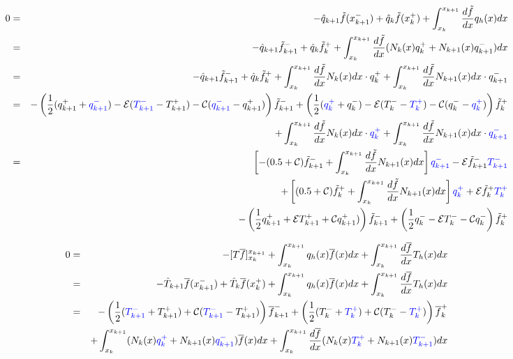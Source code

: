 \begin{eqnarray}
0 &=&
-\hat{q}_{k+1} \tilde{f}(x_{k+1}^-)
+\hat{q}_k     \tilde{f}(x_k^+)
+ \int_{x_k}^{x_{k+1}} \frac{d\tilde{f}}{dx} q_h(x) dx  \nonumber\\
&=&-\hat{q}_{k+1} \tilde{f}_{k+1}^-
+\hat{q}_k     \tilde{f}_k^+
+ \int_{x_k}^{x_{k+1}} \frac{d\tilde{f}}{dx} ( N_k(x) q_k^+ + N_{k+1}(x)q_{k+1}^- ) dx \nonumber\\
&=& -\hat{q}_{k+1} \tilde{f}_{k+1}^-
+\hat{q}_k     \tilde{f}_k^+
+ \int_{x_k}^{x_{k+1}} \frac{d\tilde{f}}{dx} N_k(x) dx \cdot q_k^+ 
+ \int_{x_k}^{x_{k+1}} \frac{d\tilde{f}}{dx} N_{k+1}(x) dx \cdot q_{k+1}^- \nonumber\\
&=&
-\left( \frac{1}{2}(q_{k+1}^+ + {\color{blue} q_{k+1}^-}) 
- {\cal E} ({\color{blue}T_{k+1}^-} - T_{k+1}^+) - {\cal C}({\color{blue} q_{k+1}^-} - q_{k+1}^+) \right) \tilde{f}_{k+1}^-
+\left( \frac{1}{2}({\color{blue} q_k^+} + q_k^-) - {\cal E} (T_k^- - {\color{blue}T_k^+}) 
- {\cal C}(q_k^- - {\color{blue}q_k^+}) \right) \tilde{f}_k^+ \nonumber\\
&& + \int_{x_k}^{x_{k+1}} \frac{d\tilde{f}}{dx} N_k(x) dx \cdot {\color{blue} q_k^+} 
+ \int_{x_k}^{x_{k+1}} \frac{d\tilde{f}}{dx} N_{k+1}(x) dx \cdot {\color{blue} q_{k+1}^-} \nonumber\\
&=&\left[  -(0.5 +{\cal C})    \tilde{f}_{k+1}^- +  \int_{x_k}^{x_{k+1}} \frac{d\tilde{f}}{dx} N_{k+1}(x) dx   \right]  {\color{blue}q_{k+1}^-}  - {\cal E}    \tilde{f}_{k+1}^- {\color{blue} T_{k+1}^-}  \nonumber\\
&&+ \left[ (0.5+{\cal C}) \tilde{f}_k^+  + \int_{x_k}^{x_{k+1}} \frac{d\tilde{f}}{dx} N_{k+1}(x) dx \right] {\color{blue}q_k^+} + {\cal E} \tilde{f}_k^+ {\color{blue}T_k^+} \nonumber\\
&& 
-\left( \frac{1}{2}q_{k+1}^+   
+ {\cal E} T_{k+1}^+ + {\cal C}  q_{k+1}^+) \right) \tilde{f}_{k+1}^-
+\left( \frac{1}{2} q_k^- - {\cal E} T_k^-  
- {\cal C}q_k^-  \right) \tilde{f}_k^+ \nonumber\\
\end{eqnarray}



\begin{eqnarray}
0&=&
-[ T \overline{f}  ]_{x_k}^{x_{k+1}} 
+ \int_{x_k}^{x_{k+1}}  q_h(x) \overline{f}(x) dx
+ \int_{x_k}^{x_{k+1}} \frac{d\overline{f}}{dx} T_h(x) dx  
\nonumber\\
&=&
-\hat{T}_{k+1} \overline{f}(x_{k+1}^-) 
+\hat{T}_k     \overline{f}(x_{k}^+) 
+ \int_{x_k}^{x_{k+1}}  q_h(x) \overline{f}(x) dx
+ \int_{x_k}^{x_{k+1}} \frac{d\overline{f}}{dx} T_h(x) dx  \nonumber\\
&=&
-\left( \frac{1}{2}({\color{blue}T_{k+1}^-}+ T_{k+1}^+) 
+ {\cal C} ({\color{blue} T_{k+1}^-} - T_{k+1}^+) \right) \overline{f}_{k+1}^-
+\left( \frac{1}{2}(T_k^-+{\color{blue}T_k^+}) + {\cal C} (T_k^- - {\color{blue}T_k^+}) \right) \overline{f}_{k}^+ \nonumber\\
&& + \int_{x_k}^{x_{k+1}} ( N_k(x) {\color{blue}q_k^+} + N_{k+1}(x) {\color{blue}q_{k+1}^-}    ) \overline{f}(x) dx
+ \int_{x_k}^{x_{k+1}} \frac{d\overline{f}}{dx} ( N_k(x) {\color{blue}T_k^+} + N_{k+1}(x) {\color{blue}T_{k+1}^-}  ) dx \nonumber
\end{eqnarray}

